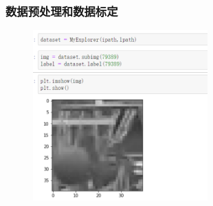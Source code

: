 \documentclass[notheorems, aspectratio=54]{beamer}
\begin{document}
\begin{frame}
\frametitle{数据预处理和数据标定}
\begin{figure}[htbp]
	\centering
	\includegraphics[width=0.6\textwidth]{myExplorer.png}
\end{figure}
\end{frame}
\end{document}
